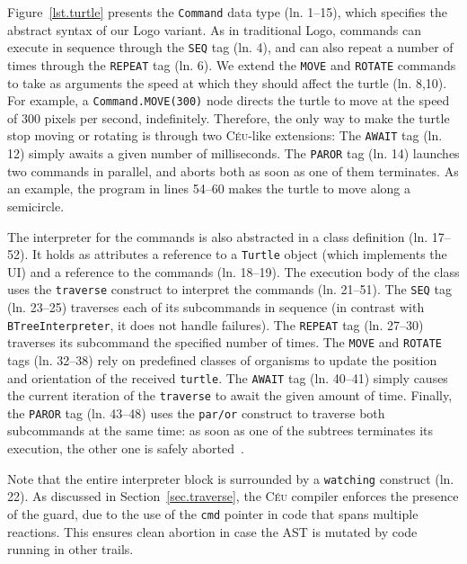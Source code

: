 \documentclass{sig-alternate}
\newcommand{\CEU}{\textsc{C\'{e}u}\xspace}
\newcommand{\code}[1] {{\small{\texttt{#1}}}}
\begin{document}
Figure~\ref{lst.turtle} presents the \code{Command} data type (ln. 1--15), 
which specifies the abstract syntax of our Logo variant.
As in traditional Logo, commands can execute in sequence through the \code{SEQ} 
tag (ln. 4), and can also repeat a number of times through the \code{REPEAT} 
tag (ln. 6).
%
We extend the \code{MOVE} and \code{ROTATE} commands to take as arguments the 
speed at which they should affect the turtle (ln. 8,10).
For example, a \code{Command.MOVE(300)} node directs the turtle to move at the 
speed of 300 pixels per second, indefinitely.
%
Therefore, the only way to make the turtle stop moving or rotating is through 
two \CEU-like extensions:
The \code{AWAIT} tag (ln. 12) simply awaits a given number of milliseconds.
The \code{PAROR} tag (ln. 14) launches two commands in parallel, and aborts 
both as soon as one of them terminates.
%
As an example, the program in lines 54--60 makes the turtle to move along a 
semicircle.

The interpreter for the commands is also abstracted in a class definition 
(ln. 17--52).
%
It holds as attributes a reference to a \code{Turtle} object (which implements 
the UI) and a reference to the commands (ln. 18--19).
The execution body of the class uses the \code{traverse} construct to interpret 
the commands (ln. 21--51).
%
The \code{SEQ} tag (ln. 23--25) traverses each of its subcommands in sequence 
(in contrast with \code{BTreeInterpreter}, it does not handle failures).
%
The \code{REPEAT} tag (ln. 27--30) traverses its subcommand the specified number 
of times.
%
The \code{MOVE} and \code{ROTATE} tags (ln. 32--38) rely on predefined classes 
of organisms to update the position and orientation of the received 
\code{turtle}.
%
The \code{AWAIT} tag (ln. 40--41) simply causes the current iteration of the 
\code{traverse} to await the given amount of time.
%
Finally, the \code{PAROR} tag (ln. 43--48) uses the \code{par/or} construct
to traverse both subcommands at the same time:
as soon as one of the subtrees terminates its execution, the other one is 
safely aborted~\cite{ceu.sensys13}.

Note that the entire interpreter block is surrounded by a \code{watching}
construct (ln. 22).
As discussed in Section~\ref{sec.traverse}, the \CEU compiler enforces the 
presence of the guard, due to the use of the \code{cmd} pointer in code that 
spans multiple reactions. This ensures clean abortion in case the AST is 
mutated by code running in other trails.
\end{document}
